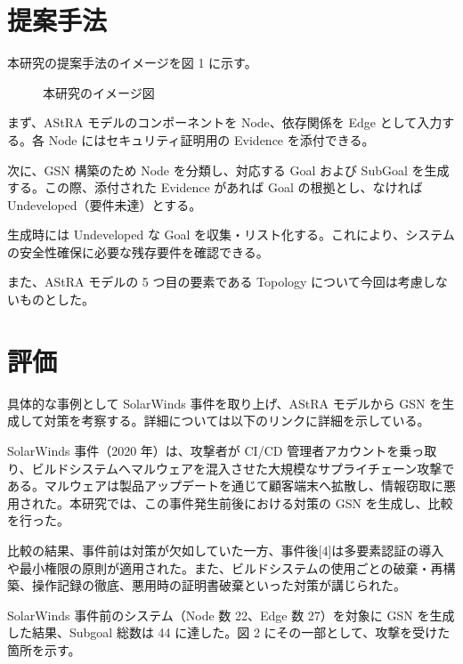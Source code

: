 \documentclass[twocolumn,a4paper,10pt]{ltjsarticle}
\begin{document}
\section{提案手法}
本研究の提案手法のイメージを図 1 に示す。

\begin{figure}[htbp]
    \centering
    \caption{本研究のイメージ図}
    \label{fig:method}
\end{figure}

まず、AStRA モデルのコンポーネントを Node、依存関係を Edge として入力する。各 Node にはセキュリティ証明用の Evidence を添付できる。

次に、GSN 構築のため Node を分類し、対応する Goal および SubGoal を生成する。この際、添付された Evidence があれば Goal の根拠とし、なければ Undeveloped（要件未達）とする。

生成時には Undeveloped な Goal を収集・リスト化する。これにより、システムの安全性確保に必要な残存要件を確認できる。

また、AStRA モデルの 5 つ目の要素である Topology について今回は考慮しないものとした。

\section{評価}
具体的な事例として SolarWinds 事件を取り上げ、AStRA モデルから GSN を生成して対策を考察する。詳細については以下のリンクに詳細を示している\footnotemark[1]\footnotemark[2]。

SolarWinds 事件（2020 年）は、攻撃者が CI/CD 管理者アカウントを乗っ取り、ビルドシステムへマルウェアを混入させた大規模なサプライチェーン攻撃である。マルウェアは製品アップデートを通じて顧客端末へ拡散し、情報窃取に悪用された。本研究では、この事件発生前後における対策の GSN を生成し、比較を行った。

比較の結果、事件前は対策が欠如していた一方、事件後[4]は多要素認証の導入や最小権限の原則が適用された。また、ビルドシステムの使用ごとの破棄・再構築、操作記録の徹底、悪用時の証明書破棄といった対策が講じられた。

SolarWinds 事件前のシステム（Node 数 22、Edge 数 27）を対象に GSN を生成した結果、Subgoal 総数は 44 に達した。図 2 にその一部として、攻撃を受けた箇所を示す。
\end{document}

